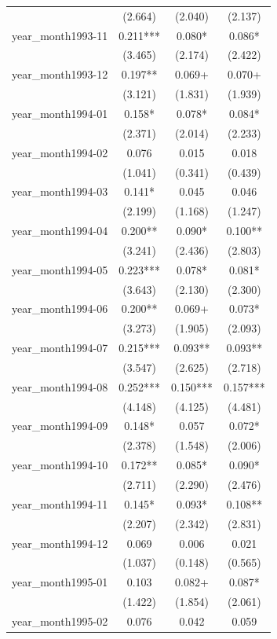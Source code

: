 \documentclass[
  norsk,
  a4paper,
]{article}
\begin{document}
\begin{table}
\begin{tabular*}{\linewidth}{@{\extracolsep{\fill}}lccc}
 & (2.664) & (2.040) & (2.137) \\ 
year\_month1993-11 & 0.211*** & 0.080* & 0.086* \\ 
 & (3.465) & (2.174) & (2.422) \\ 
year\_month1993-12 & 0.197** & 0.069+ & 0.070+ \\ 
 & (3.121) & (1.831) & (1.939) \\ 
year\_month1994-01 & 0.158* & 0.078* & 0.084* \\ 
 & (2.371) & (2.014) & (2.233) \\ 
year\_month1994-02 & 0.076 & 0.015 & 0.018 \\ 
 & (1.041) & (0.341) & (0.439) \\ 
year\_month1994-03 & 0.141* & 0.045 & 0.046 \\ 
 & (2.199) & (1.168) & (1.247) \\ 
year\_month1994-04 & 0.200** & 0.090* & 0.100** \\ 
 & (3.241) & (2.436) & (2.803) \\ 
year\_month1994-05 & 0.223*** & 0.078* & 0.081* \\ 
 & (3.643) & (2.130) & (2.300) \\ 
year\_month1994-06 & 0.200** & 0.069+ & 0.073* \\ 
 & (3.273) & (1.905) & (2.093) \\ 
year\_month1994-07 & 0.215*** & 0.093** & 0.093** \\ 
 & (3.547) & (2.625) & (2.718) \\ 
year\_month1994-08 & 0.252*** & 0.150*** & 0.157*** \\ 
 & (4.148) & (4.125) & (4.481) \\ 
year\_month1994-09 & 0.148* & 0.057 & 0.072* \\ 
 & (2.378) & (1.548) & (2.006) \\ 
year\_month1994-10 & 0.172** & 0.085* & 0.090* \\ 
 & (2.711) & (2.290) & (2.476) \\ 
year\_month1994-11 & 0.145* & 0.093* & 0.108** \\ 
 & (2.207) & (2.342) & (2.831) \\ 
year\_month1994-12 & 0.069 & 0.006 & 0.021 \\ 
 & (1.037) & (0.148) & (0.565) \\ 
year\_month1995-01 & 0.103 & 0.082+ & 0.087* \\ 
 & (1.422) & (1.854) & (2.061) \\ 
year\_month1995-02 & 0.076 & 0.042 & 0.059 \\ 

\end{tabular*}
\end{table}
\end{document}
